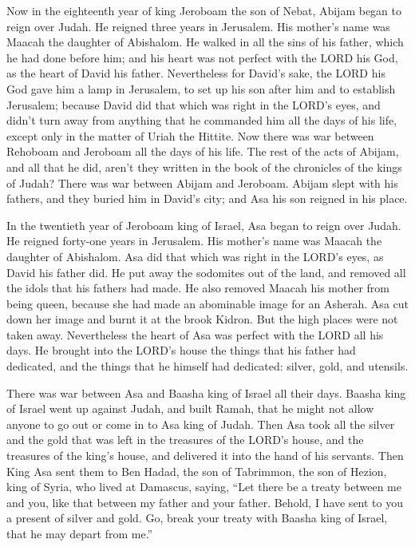  Now in the eighteenth year of king Jeroboam the son of
Nebat, Abijam began to reign over Judah.  He reigned three
years in Jerusalem. His mother's name was Maacah the daughter of
Abishalom.  He walked in all the sins of his father, which
he had done before him; and his heart was not perfect with the LORD his
God, as the heart of David his father.  Nevertheless for
David's sake, the LORD his God gave him a lamp in Jerusalem, to set up
his son after him and to establish Jerusalem;  because
David did that which was right in the LORD's eyes, and didn't turn away
from anything that he commanded him all the days of his life, except
only in the matter of Uriah the Hittite.  Now there was
war between Rehoboam and Jeroboam all the days of his life.
 The rest of the acts of Abijam, and all that he did,
aren't they written in the book of the chronicles of the kings of Judah?
There was war between Abijam and Jeroboam.  Abijam slept
with his fathers, and they buried him in David's city; and Asa his son
reigned in his place.

 In the twentieth year of Jeroboam king of Israel, Asa
began to reign over Judah.  He reigned forty-one years in
Jerusalem. His mother's name was Maacah the daughter of Abishalom.
 Asa did that which was right in the LORD's eyes, as
David his father did.  He put away the sodomites out of
the land, and removed all the idols that his fathers had made.
 He also removed Maacah his mother from being queen,
because she had made an abominable image for an Asherah. Asa cut down
her image and burnt it at the brook Kidron.  But the high
places were not taken away. Nevertheless the heart of Asa was perfect
with the LORD all his days.  He brought into the LORD's
house the things that his father had dedicated, and the things that he
himself had dedicated: silver, gold, and utensils.

 There was war between Asa and Baasha king of Israel all
their days.  Baasha king of Israel went up against Judah,
and built Ramah, that he might not allow anyone to go out or come in to
Asa king of Judah.  Then Asa took all the silver and the
gold that was left in the treasures of the LORD's house, and the
treasures of the king's house, and delivered it into the hand of his
servants. Then King Asa sent them to Ben Hadad, the son of Tabrimmon,
the son of Hezion, king of Syria, who lived at Damascus, saying,
 ``Let there be a treaty between me and you, like that
between my father and your father. Behold, I have sent to you a present
of silver and gold. Go, break your treaty with Baasha king of Israel,
that he may depart from me.''

